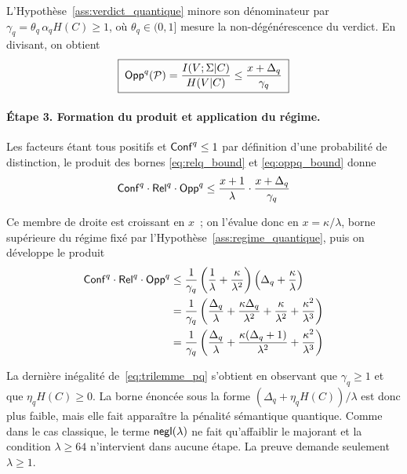 \begin{sloppypar}
\begin{Preuve}
L'Hypoth\`ese~\ref{ass:verdict_quantique} minore son d\'enominateur par
$\gamma_q = \theta_q\,\alpha_q H(C) \geq 1$, o\`u $\theta_q \in (0,1]$
mesure la non-d\'eg\'en\'erescence du verdict. En divisant, on obtient
\begin{equation}
\boxed{\;\mathsf{Opp}^q(\mathcal{P}) = \frac{I(V; \Sigma|C)}{H(V|C)} \leq \frac{x + \Delta_q}{\gamma_q}\;}
\label{eq:oppq_bound}
\end{equation}

\paragraph{\'Etape 3. Formation du produit et application du r\'egime.}
Les facteurs \'etant tous positifs et $\mathsf{Conf}^q \leq 1$ par d\'efinition
d'une probabilit\'e de distinction, le produit des bornes
\eqref{eq:relq_bound} et \eqref{eq:oppq_bound} donne
\begin{equation}
\mathsf{Conf}^q \cdot \mathsf{Rel}^q \cdot \mathsf{Opp}^q \leq \frac{x+1}{\lambda} \cdot \frac{x+\Delta_q}{\gamma_q}
\label{eq:produit_q_brut}
\end{equation}

Ce membre de droite est croissant en $x$~; on l'\'evalue donc en
$x = \kappa/\lambda$, borne sup\'erieure du r\'egime fix\'e par
l'Hypoth\`ese~\ref{ass:regime_quantique}, puis on d\'eveloppe le produit
\begin{align}
\mathsf{Conf}^q \cdot \mathsf{Rel}^q \cdot \mathsf{Opp}^q
&\leq \frac{1}{\gamma_q}\left(\frac{1}{\lambda} + \frac{\kappa}{\lambda^2}\right)\left(\Delta_q + \frac{\kappa}{\lambda}\right) \nonumber \\
&= \frac{1}{\gamma_q}\left(\frac{\Delta_q}{\lambda} + \frac{\kappa\Delta_q}{\lambda^2} + \frac{\kappa}{\lambda^2} + \frac{\kappa^2}{\lambda^3}\right) \nonumber \\
&= \frac{1}{\gamma_q}\left(\frac{\Delta_q}{\lambda} + \frac{\kappa(\Delta_q+1)}{\lambda^2} + \frac{\kappa^2}{\lambda^3}\right)
\end{align}

La derni\`ere in\'egalit\'e de~\eqref{eq:trilemme_pq} s'obtient en
observant que $\gamma_q \geq 1$ et que $\eta_q H(C) \geq 0$. La borne
\'enonc\'ee sous la forme $(\Delta_q + \eta_q H(C))/\lambda$ est donc plus
faible, mais elle fait appara\^itre la p\'enalit\'e
s\'emantique quantique. Comme dans le cas classique, le terme $\mathsf{negl}(\lambda)$ ne
fait qu'affaiblir le majorant et la condition $\lambda \geq 64$ n'intervient dans
aucune \'etape. La preuve demande seulement $\lambda \geq 1$.
\end{Preuve}


\end{sloppypar}
